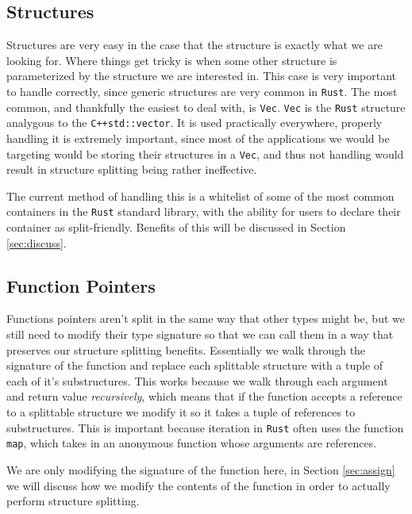 \documentclass[12pt,oneside]{book}
\newcommand{\rustname}{{\texttt{Rust}}}
\def \rust {\rustname{}\xspace}
\newcommand{\cppname}{{\texttt{C++}}}
\def \cpp {\cppname{}\xspace}
\newcommand{\vecname}{{\texttt{Vec}}}
\def \vec{\vecname{}\xspace}
\begin{document}

\subsection{Structures}
Structures are very easy in the case that the structure is exactly what we are
looking for. Where things get tricky is when some other structure is
parameterized by the structure we are interested in. This case is very important
to handle correctly, since generic structures are very common in \rust. The most common,
and thankfully the easiest to deal with, is \vec. \vec is the \rust structure analygous
to the \cpp \texttt{std::vector}. It is used practically everywhere, properly handling it
is extremely important, since most of the applications we would be targeting would be storing
their structures in a \vec, and thus not handling would result in structure splitting being
rather ineffective.

The current method of handling this is a whitelist of some of the most common containers
in the \rust standard library, with the ability for users to declare their container as split-friendly.
Benefits of this will be discussed in Section \ref{sec:discuss}.

\subsection{Function Pointers}
Functions pointers aren't split in the same way that other types might be, but
we still need to modify their type signature so that we can call them in a way
that preserves our structure splitting benefits. Essentially we walk through the
signature of the function and replace each splittable structure with a tuple
of each of it's substructures. This works because we walk through each argument and 
return value \textit{recursively}, which means that if the function accepts a reference
to a splittable structure we modify it so it takes a tuple of references to substructures.
This is important because iteration in \rust often uses the function \texttt{map}, which
takes in an anonymous function whose arguments are references. 

We are only modifying the signature of the function here, in Section \ref{sec:assign} we will
discuss how we modify the contents of the function in order to actually perform structure
splitting.
\end{document}
